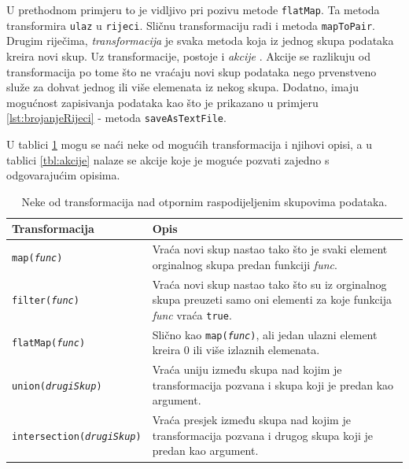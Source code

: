 \documentclass[times, utf8, zavrsni, numeric]{fer}
\begin{document}
U prethodnom primjeru to je vidljivo pri pozivu metode \texttt{flatMap}. Ta metoda transformira \texttt{ulaz} u  \texttt{rijeci}. Sličnu transformaciju radi i metoda \texttt{mapToPair}. Drugim riječima, \emph{transformacija}  je svaka metoda koja iz jednog skupa podataka kreira novi skup. Uz transformacije, postoje i \emph{akcije} . Akcije se razlikuju od transformacija po tome što ne vraćaju novi skup podataka nego prvenstveno služe za dohvat jednog ili više elemenata iz nekog skupa. Dodatno, imaju mogućnost zapisivanja podataka kao što je prikazano u primjeru \ref{lst:brojanjeRijeci} - metoda \texttt{saveAsTextFile}.

U tablici \ref{tbl:transformacije} mogu se naći neke od mogućih transformacija i njihovi opisi, a u tablici \ref{tbl:akcije} nalaze se akcije koje je moguće pozvati zajedno s odgovarajućim opisima.
\begin{table}[htb]
\caption{Neke od transformacija nad otpornim raspodijeljenim skupovima podataka.}
\label{tbl:transformacije}
\centering
\begin{tabular}{lp{8cm}} 
\hline
Transformacija & Opis\\
\hline
\texttt{map(\emph{func})} & Vraća novi skup nastao tako što je svaki element orginalnog  skupa predan funkciji \emph{func}. \\
\texttt{filter(\emph{func})} & Vraća novi skup nastao tako što su iz orginalnog skupa preuzeti samo oni elementi za koje funkcija \emph{func} vraća \texttt{true}. \\
\texttt{flatMap(\emph{func})} & Slično kao \texttt{map(\emph{func})}, ali jedan ulazni element kreira 0 ili više izlaznih elemenata. \\
\texttt{union(\emph{drugiSkup})} & Vraća uniju između skupa nad kojim je transformacija pozvana i skupa koji je predan kao argument. \\
\texttt{intersection(\emph{drugiSkup})} & Vraća presjek između skupa nad kojim je transformacija pozvana i drugog skupa koji je predan kao argument. \\
\hline
\end{tabular}
\end{table}
\end{document}

